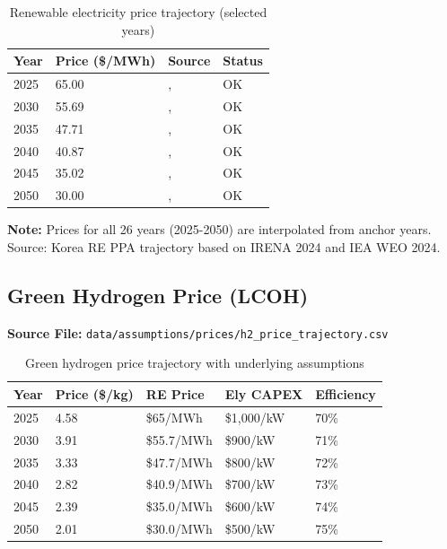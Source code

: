 \documentclass[12pt,a4paper]{article}
\newcommand{\sourceok}[1]{\textcolor{sourcegreen}{#1}}
\begin{document}
\begin{table}[H]
\centering
\begin{tabular}{llll}
\toprule
\textbf{Year} & \textbf{Price (\$/MWh)} & \textbf{Source} & \textbf{Status} \\
\midrule
2025 & 65.00 & \citet{irena2024}, \citet{iea2024} & \sourceok{OK} \\
2030 & 55.69 & \citet{irena2024}, \citet{iea2024} & \sourceok{OK} \\
2035 & 47.71 & \citet{irena2024}, \citet{iea2024} & \sourceok{OK} \\
2040 & 40.87 & \citet{irena2024}, \citet{iea2024} & \sourceok{OK} \\
2045 & 35.02 & \citet{irena2024}, \citet{iea2024} & \sourceok{OK} \\
2050 & 30.00 & \citet{irena2024}, \citet{iea2024} & \sourceok{OK} \\
\bottomrule
\end{tabular}
\caption{Renewable electricity price trajectory (selected years)}
\end{table}

\textbf{Note:} Prices for all 26 years (2025-2050) are interpolated from anchor years. Source: Korea RE PPA trajectory based on IRENA 2024 and IEA WEO 2024.

\subsection{Green Hydrogen Price (LCOH)}
\textbf{Source File:} \texttt{data/assumptions/prices/h2\_price\_trajectory.csv}

\begin{table}[H]
\centering
\begin{tabular}{lllll}
\toprule
\textbf{Year} & \textbf{Price (\$/kg)} & \textbf{RE Price} & \textbf{Ely CAPEX} & \textbf{Efficiency} \\
\midrule
2025 & 4.58 & \$65/MWh & \$1,000/kW & 70\% \\
2030 & 3.91 & \$55.7/MWh & \$900/kW & 71\% \\
2035 & 3.33 & \$47.7/MWh & \$800/kW & 72\% \\
2040 & 2.82 & \$40.9/MWh & \$700/kW & 73\% \\
2045 & 2.39 & \$35.0/MWh & \$600/kW & 74\% \\
2050 & 2.01 & \$30.0/MWh & \$500/kW & 75\% \\
\bottomrule
\end{tabular}
\caption{Green hydrogen price trajectory with underlying assumptions}
\end{table}
\end{document}
